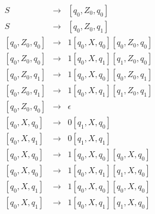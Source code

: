 \begin{eqnarray*}
S & \rightarrow & [q_0, Z_0, q_0] \\
S & \rightarrow & [q_0, Z_0, q_1] \\
\left[q_0, Z_0, q_0\right] & \rightarrow & 1[q_0, X, q_0][q_0, Z_0, q_0] \\
\left[q_0, Z_0, q_0\right] & \rightarrow & 1[q_0, X, q_1][q_1, Z_0, q_0] \\
\left[q_0, Z_0, q_1\right] & \rightarrow & 1[q_0, X, q_0][q_0, Z_0, q_1] \\
\left[q_0, Z_0, q_1\right] & \rightarrow & 1[q_0, X, q_1][q_1, Z_0, q_1] \\
\left[q_0, Z_0, q_0\right] & \rightarrow & \epsilon \\
\left[q_0, X, q_0\right] & \rightarrow & 0[q_1, X, q_0] \\
\left[q_0, X, q_1\right] & \rightarrow & 0[q_1, X, q_1] \\
\left[q_0, X, q_0\right] & \rightarrow & 1[q_0, X, q_0][q_0, X, q_0] \\
\left[q_0, X, q_0\right] & \rightarrow & 1[q_0, X, q_1][q_1, X, q_0] \\
\left[q_0, X, q_1\right] & \rightarrow & 1[q_0, X, q_0][q_0, X, q_0] \\
\left[q_0, X, q_1\right] & \rightarrow & 1[q_0, X, q_1][q_1, X, q_0] 
\end{eqnarray*}


